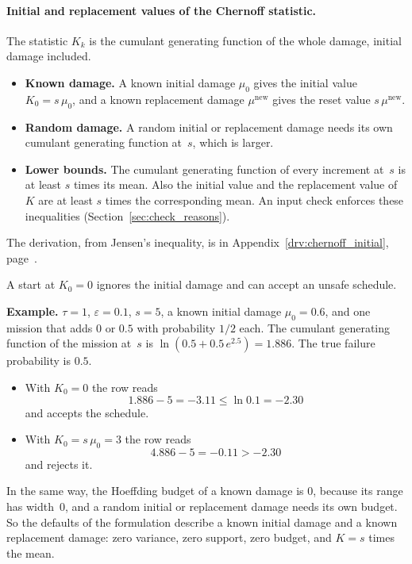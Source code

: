 \documentclass[11pt,a4paper]{article}
\theoremstyle{plain}
\theoremstyle{definition}
\theoremstyle{remark}
\begin{document}
\paragraph{Initial and replacement values of the Chernoff statistic.}
The statistic $K_k$ is the cumulant generating function of the whole damage, initial damage included.
\begin{itemize}
  \item \textbf{Known damage.} A known initial damage $\mu_0$ gives the initial value $K_0 = s\,\mu_0$, and a known replacement damage $\mu^{\mathrm{new}}$ gives the reset value $s\,\mu^{\mathrm{new}}$.
  \item \textbf{Random damage.} A random initial or replacement damage needs its own cumulant generating function at~$s$, which is larger.
  \item \textbf{Lower bounds.} The cumulant generating function of every increment at~$s$ is at least $s$ times its mean.
    Also the initial value and the replacement value of~$K$ are at least $s$ times the corresponding mean.
    An input check enforces these inequalities (Section~\ref{sec:check_reasons}).
\end{itemize}
The derivation, from Jensen's inequality, is in Appendix~\ref{drv:chernoff_initial}, page~\pageref{drv:chernoff_initial}.

A start at $K_0 = 0$ ignores the initial damage and can accept an unsafe schedule.
\begin{examplebox}
\textbf{Example.} $\tau = 1$, $\varepsilon = 0.1$, $s = 5$, a known initial damage $\mu_0 = 0.6$, and one mission that adds $0$ or $0.5$ with probability $1/2$ each.
The cumulant generating function of the mission at~$s$ is $\ln(0.5 + 0.5\,e^{2.5}) = 1.886$.
The true failure probability is $0.5$.
\begin{itemize}
  \item With $K_0 = 0$ the row reads
    \begin{equation}
      1.886 - 5 = -3.11 \le \ln 0.1 = -2.30
    \end{equation}
    and accepts the schedule.
  \item With $K_0 = s\,\mu_0 = 3$ the row reads
    \begin{equation}
      4.886 - 5 = -0.11 > -2.30
    \end{equation}
    and rejects it.
\end{itemize}
\end{examplebox}

In the same way, the Hoeffding budget of a known damage is $0$, because its range has width~$0$, and a random initial or replacement damage needs its own budget.
So the defaults of the formulation describe a known initial damage and a known replacement damage: zero variance, zero support, zero budget, and $K = s$ times the mean.
\end{document}
